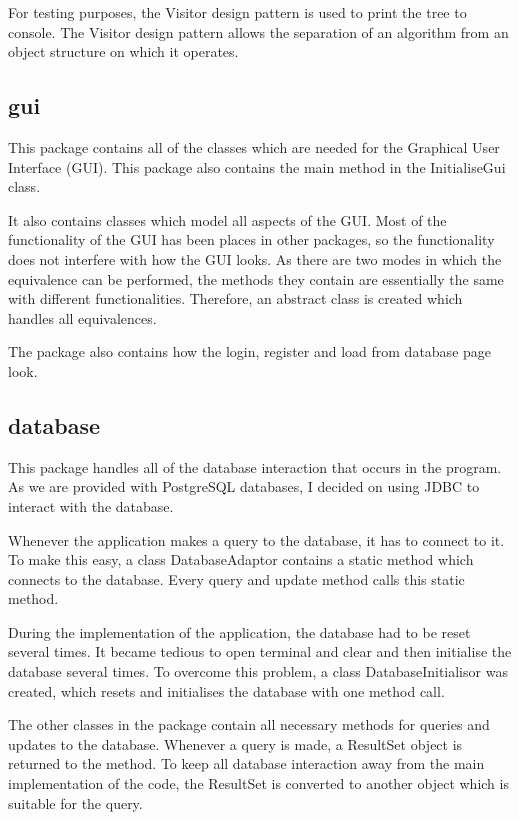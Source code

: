 \documentclass{report}
\begin{document}
For testing purposes, the Visitor design pattern is used to print the tree
to console. The Visitor design pattern allows the separation of an algorithm
from an object structure on which it operates.

\subsection{gui}
This package contains all of the classes which are needed for the Graphical
User Interface (GUI). This package also contains the main method in the
InitialiseGui class.

It also contains classes which model all aspects of the GUI. Most of the functionality
of the GUI has been places in other packages, so the functionality does not
interfere with how the GUI looks. As there are two modes in which the equivalence
can be performed, the methods they contain are essentially the same with different
functionalities. Therefore, an abstract class is created which handles
all equivalences.

The package also contains how the login, register and load from database page
look.

\subsection{database}
This package handles all of the database interaction that occurs in the program.
As we are provided with PostgreSQL databases, I decided on using JDBC to interact
with the database.

Whenever the application makes a query to the database, it has to connect
to it. To make this easy, a class DatabaseAdaptor contains a static method
which connects to the database. Every query and update method calls this
static method.

During the implementation of the application, the database had to be reset
several times. It became tedious to open terminal and clear and then
initialise the database several times. To overcome this problem, a class
DatabaseInitialisor was created, which resets and initialises the database
with one method call.

The other classes in the package contain all necessary methods for queries and
updates to the database. Whenever a query is made, a ResultSet object is returned
to the method. To keep all database interaction away from the main implementation
of the code, the ResultSet is converted to another object which is suitable
for the query.
\end{document}
